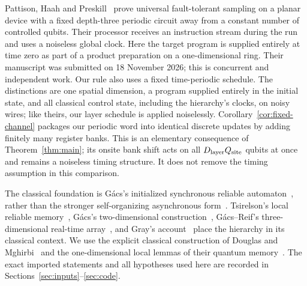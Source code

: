 Pattison, Haah and Preskill~\cite[Theorems~4.5 and~5.7]{PHP2026} prove universal fault-tolerant sampling on a planar device with a fixed depth-three periodic circuit away from a constant number of controlled qubits. Their processor receives an instruction stream during the run and uses a noiseless global clock. Here the target program is supplied entirely at time zero as part of a product preparation on a one-dimensional ring. Their manuscript was submitted on 18 November 2026; this is concurrent and independent work. Our rule also uses a fixed time-periodic schedule. The distinctions are one spatial dimension, a program supplied entirely in the initial state, and all classical control state, including the hierarchy's clocks, on noisy wires; like theirs, our layer schedule is applied noiselessly. Corollary~\ref{cor:fixed-channel} packages our periodic word into identical discrete updates by adding finitely many register banks. This is an elementary consequence of Theorem~\ref{thm:main}; its onsite bank shift acts on all $D_{\rm layer}Q_{\rm site}$ qubits at once and remains a noiseless timing structure. It does not remove the timing assumption in this comparison.


The classical foundation is G\'acs's initialized synchronous reliable automaton~\cite{Gacs1986}, rather than the stronger self-organizing asynchronous form~\cite{Gacs2001}. Tsirelson's local reliable memory~\cite{Cirelson1978}, G\'acs's two-dimensional construction~\cite{Gacs1989}, G\'acs--Reif's three-dimensional real-time array~\cite{GacsReif1988}, and Gray's account~\cite{Gray2001} place the hierarchy in its classical context. We use the explicit classical construction of Douglas and Mghirbi~\cite{DMNoise1D2026} and the one-dimensional local lemmas of their quantum memory~\cite{DMMemory2026}. The exact imported statements and all hypotheses used here are recorded in Sections~\ref{sec:inputs}--\ref{sec:code}.

